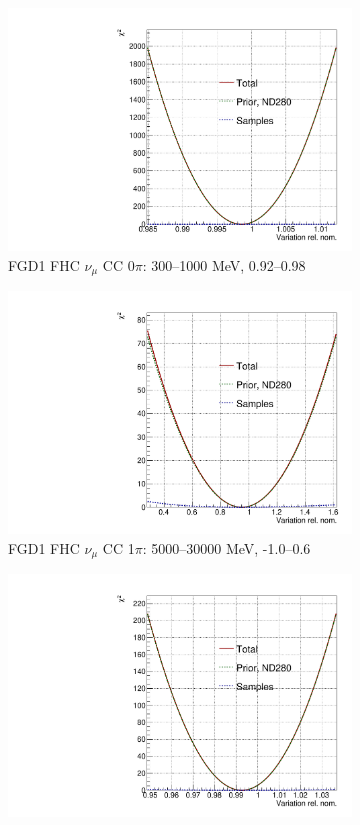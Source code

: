 \begin{figure}[!htbp]
\centering
\begin{subfigure}{.49\textwidth}
  \centering
  \includegraphics[width=0.7\linewidth]{figs/llh/ndd_13_llh.pdf}
  \caption{FGD1 FHC $\nu_{\mu}$ CC 0$\pi$: 300--1000 MeV, 0.92--0.98}
\end{subfigure}
\begin{subfigure}{.49\textwidth}
  \centering
  \includegraphics[width=0.7\linewidth]{figs/llh/ndd_136_llh.pdf}
  \caption{FGD1 FHC $\nu_{\mu}$ CC 1$\pi$: 5000--30000 MeV, -1.0--0.6}
\end{subfigure}
\begin{subfigure}{.49\textwidth}
  \centering
  \includegraphics[width=0.7\linewidth]{figs/llh/ndd_541_llh.pdf}

\end{subfigure}
\end{figure}
